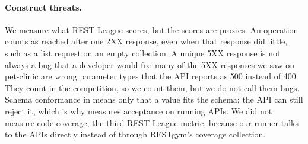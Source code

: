 \paragraph{Construct threats.} We measure what REST League scores, but the
scores are proxies. An operation counts as reached after one 2XX response,
even when that response did little, such as a list request on an empty
collection. A unique 5XX response is not always a bug that a developer would
fix: many of the 5XX responses we saw on pet-clinic are wrong parameter types
that the API reports as 500 instead of 400. They count in the competition, so
we count them, but we do not call them bugs. Schema conformance in 
means only that a value fits the schema; the API can still reject it, which
is why  measures acceptance on running APIs. We did not measure code
coverage, the third REST League metric, because our runner talks to the APIs
directly instead of through RESTgym's coverage collection.

